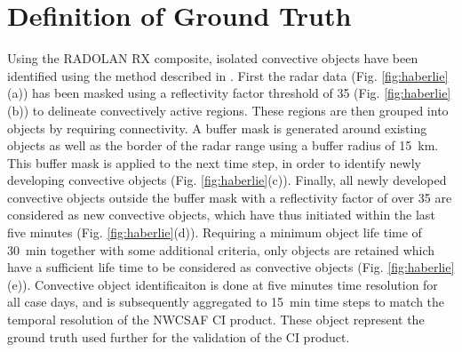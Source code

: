 \section{Definition of Ground Truth}
\label{sec:haci}
Using the RADOLAN RX composite, isolated convective objects have been identified using the method described in \citet{Haberlie_2015}. First the radar data (Fig. \ref{fig:haberlie}(a)) has been masked using a reflectivity factor threshold of \SI{35}{\dbZ} (Fig. \ref{fig:haberlie}(b)) to delineate convectively active regions. These regions are then grouped into objects by requiring connectivity. A buffer mask is generated around existing objects as well as the border of the radar range using a buffer radius of \SI{15}{\kilo\metre}. This buffer mask is applied to the next time step, in order to identify newly developing convective objects (Fig. \ref{fig:haberlie}(c)). Finally, all newly developed convective objects outside the buffer mask with a reflectivity factor of over \SI{35}{\dbZ} are considered as new convective objects, which have thus initiated within the last five minutes (Fig. \ref{fig:haberlie}(d)). Requiring a minimum object life time of \SI{30}{\minute} together with some additional  criteria, only objects are retained which have a sufficient life time to be considered as convective objects (Fig. \ref{fig:haberlie}(e)). Convective object identificaiton is done at five minutes time resolution for all case days, and is subsequently aggregated to \SI{15}{\minute} time steps to match the temporal resolution of the NWCSAF CI product. These object represent the ground truth used further for the validation of the CI product.

